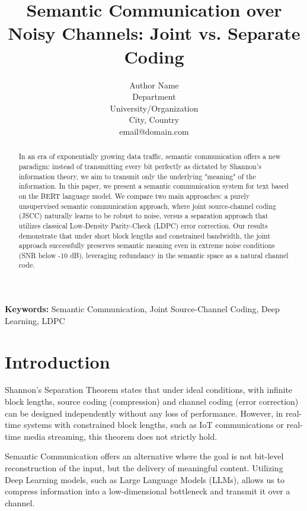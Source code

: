 \documentclass[a4paper,11pt]{article}
\begin{document}
\title{\textbf{Semantic Communication over Noisy Channels: Joint vs. Separate Coding}}

\author{Author Name \\ Department \\ University/Organization \\ City, Country \\ email@domain.com}

\date{}
\maketitle

\begin{abstract}
In an era of exponentially growing data traffic, semantic communication offers a new paradigm: instead of transmitting every bit perfectly as dictated by Shannon's information theory, we aim to transmit only the underlying "meaning" of the information. In this paper, we present a semantic communication system for text based on the BERT language model. We compare two main approaches: a purely unsupervised semantic communication approach, where joint source-channel coding (JSCC) naturally learns to be robust to noise, versus a separation approach that utilizes classical Low-Density Parity-Check (LDPC) error correction. Our results demonstrate that under short block lengths and constrained bandwidth, the joint approach successfully preserves semantic meaning even in extreme noise conditions (SNR below -10 dB), leveraging redundancy in the semantic space as a natural channel code.
\end{abstract}

\textbf{Keywords:} Semantic Communication, Joint Source-Channel Coding, Deep Learning, LDPC

\section{Introduction}
Shannon's Separation Theorem states that under ideal conditions, with infinite block lengths, source coding (compression) and channel coding (error correction) can be designed independently without any loss of performance. However, in real-time systems with constrained block lengths, such as IoT communications or real-time media streaming, this theorem does not strictly hold.

Semantic Communication offers an alternative where the goal is not bit-level reconstruction of the input, but the delivery of meaningful content. Utilizing Deep Learning models, such as Large Language Models (LLMs), allows us to compress information into a low-dimensional bottleneck and transmit it over a channel.
\end{document}
